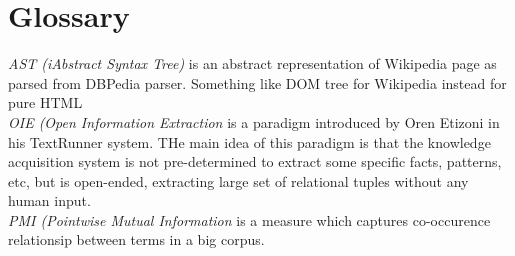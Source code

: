 % 
\chapter{Glossary}

\emph{AST (iAbstract Syntax Tree)} is an abstract representation of Wikipedia 
page as parsed from DBPedia parser. Something like DOM tree for Wikipedia 
instead for pure HTML\\
\emph{OIE (Open Information Extraction} is a paradigm introduced by Oren Etizoni in his TextRunner system. THe main idea of this paradigm is that the knowledge acquisition system is not pre-determined to extract some specific facts, patterns, etc, but is open-ended, extracting large set of relational tuples without any human input.\\
\emph{PMI (Pointwise Mutual Information} is a measure which captures 
co-occurence relationsip between terms in a big corpus.\\
